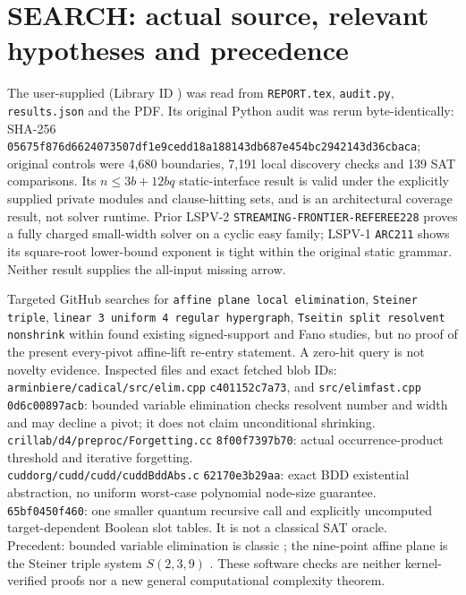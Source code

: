 \documentclass[10pt]{article}
\begin{document}
\section{SEARCH: actual source, relevant hypotheses and precedence}
The user-supplied  (Library ID ) was read from \texttt{REPORT.tex}, \texttt{audit.py}, \texttt{results.json} and the PDF. Its original Python audit was rerun byte-identically: SHA-256 \texttt{05675f876d6624073507df1e9cedd18a}\allowbreak\texttt{188143db687e454bc2942143d36cbaca}; original controls were 4,680 boundaries, 7,191 local discovery checks and 139 SAT comparisons. Its $n\le3b+12bq$ static-interface result is valid under the explicitly supplied private modules and clause-hitting sets, and is an architectural coverage result, not solver runtime. Prior LSPV-2 \texttt{STREAMING-FRONTIER-REFEREE228} proves a fully charged small-width solver on a cyclic easy family; LSPV-1 \texttt{ARC211} shows its square-root lower-bound exponent is tight within the original static grammar. Neither result supplies the all-input missing arrow.

Targeted GitHub searches for \texttt{affine plane local elimination}, \texttt{Steiner triple}, \texttt{linear 3 uniform 4 regular hypergraph}, \texttt{Tseitin split resolvent nonshrink} within  found existing signed-support and Fano studies, but no proof of the present every-pivot affine-lift re-entry statement. A zero-hit query is not novelty evidence. Inspected files and exact fetched blob IDs:\\
\texttt{arminbiere/cadical/src/elim.cpp} \texttt{c401152c7a73}, and \texttt{src/elimfast.cpp} \texttt{0d6c00897acb}: bounded variable elimination checks resolvent number and width and may decline a pivot; it does not claim unconditional shrinking.\\
\texttt{crillab/d4/preproc/Forgetting.cc} \texttt{8f00f7397b70}: actual occurrence-product threshold and iterative forgetting.\\
\texttt{cuddorg/cudd/cudd/cuddBddAbs.c} \texttt{62170e3b29aa}: exact BDD existential abstraction, no uniform worst-case polynomial node-size guarantee.\\
 \texttt{65bf0450f460}: one smaller quantum recursive call and explicitly uncomputed target-dependent Boolean slot tables. It is not a classical SAT oracle.\\
Precedent: bounded variable elimination is classic \cite{eenbiere}; the nine-point affine plane is the Steiner triple system $S(2,3,9)$ \cite{design}. These software checks are neither kernel-verified proofs nor a new general computational complexity theorem.
\end{document}

